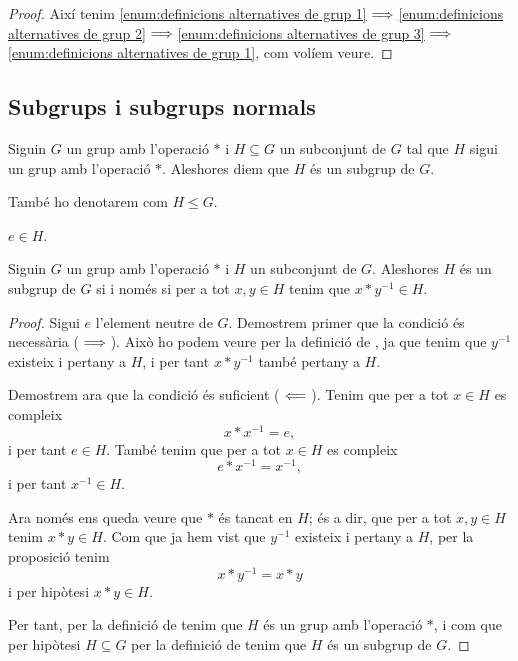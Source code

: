 \documentclass[../../Main.tex]{subfiles}
\begin{document}
\begin{theorem}
\begin{proof}
			Així tenim \eqref{enum:definicions alternatives de grup 1}\(\implies\)\eqref{enum:definicions alternatives de grup 2}\(\implies\)\eqref{enum:definicions alternatives de grup 3}\(\implies\)\eqref{enum:definicions alternatives de grup 1}, com volíem veure.
		\end{proof}
	\end{theorem}
	\subsection{Subgrups i subgrups normals}
	\begin{definition}[Subgrup]
		\label{def:subgrup}
		Siguin \(G\) un grup amb l'operació \(\ast\) i \(H\subseteq G\) un subconjunt de \(G\) tal que \(H\) sigui un grup amb l'operació \(\ast\). Aleshores diem que \(H\) és un subgrup de \(G\).
		
		També ho denotarem com \(H\leq G\).
	\end{definition}
	\begin{observation}
		\label{obs:l'element neutre d'un grup pertany als subgrups}
		\(e\in H\).
	\end{observation}
	\begin{proposition}
		\label{prop:condició equivalent a subgrup}
		Siguin \(G\) un grup amb l'operació \(\ast\) i \(H\) un subconjunt de \(G\). Aleshores \(H\) és un subgrup de \(G\) si i només si per a tot \(x,y\in H\) tenim que \(x\ast y^{-1}\in H\).
		\begin{proof}
			Sigui \(e\) l'element neutre de \(G\). Demostrem primer que la condició és necessària (\(\implies\)). Això ho podem veure per la definició de , ja que tenim que \(y^{-1}\) existeix i pertany a \(H\), i per tant \(x\ast y^{-1}\) també pertany a \(H\).
			
			Demostrem ara que la condició és suficient (\(\impliedby\)). Tenim que per a tot \(x\in H\) es compleix
			\[x\ast x^{-1}=e,\]
			i per tant \(e\in H\). També tenim que per a tot \(x\in H\) es compleix
			\[e\ast x^{-1}=x^{-1},\]
			i per tant \(x^{-1}\in H\).
			
			Ara només ens queda veure que \(\ast\) és tancat en \(H\); és a dir, que per a tot \(x,y\in H\) tenim \(x\ast y\in H\). Com que ja hem vist que \(y^{-1}\) existeix i pertany a \(H\), per la proposició  tenim
			\[x\ast y^{-1}=x\ast y\]
			i per hipòtesi \(x\ast y\in H\).
			
			Per tant, per la definició de  tenim que \(H\) és un grup amb l'operació \(\ast\), i com que per hipòtesi \(H\subseteq G\) per la definició de  tenim que \(H\) és un subgrup de \(G\).
		\end{proof}
	\end{proposition}
\end{document}
